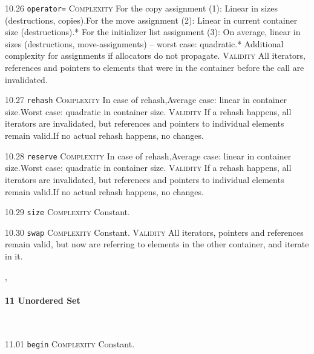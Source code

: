 \noindent\textcolor{corange}{10.26 \texttt{operator=}} \textsc{Complexity} For the copy assignment (1): Linear in sizes (destructions, copies).For the move assignment (2): Linear in current container size (destructions).* For the initializer list assignment (3): On average, linear in sizes (destructions, move-assignments) -- worst case: quadratic.* Additional complexity for assignments if allocators do not propagate. \textsc{Validity} All iterators, references and pointers to elements that were in the container before the call are invalidated.\vspace{0.5em}

\noindent\textcolor{corange}{10.27 \texttt{rehash}} \textsc{Complexity} In case of rehash,Average case: linear in container size.Worst case: quadratic in container size. \textsc{Validity} If a rehash happens, all iterators are invalidated, but references and pointers to individual elements remain valid.If no actual rehash happens, no changes.\vspace{0.5em}

\noindent\textcolor{corange}{10.28 \texttt{reserve}} \textsc{Complexity} In case of rehash,Average case: linear in container size.Worst case: quadratic in container size. \textsc{Validity} If a rehash happens, all iterators are invalidated, but references and pointers to individual elements remain valid.If no actual rehash happens, no changes.\vspace{0.5em}

\noindent\textcolor{cgreen}{10.29 \texttt{size}} \textsc{Complexity} Constant. \vspace{0.5em}

\noindent\textcolor{cgreen}{10.30 \texttt{swap}} \textsc{Complexity} Constant. \textsc{Validity} All iterators, pointers and references remain valid, but now are referring to elements in the other container, and iterate in it.\vspace{0.5em}


\sep
{}
\paragraph{11 Unordered Set}\mbox{}\\
\noindent\textcolor{cgreen}{11.01 \texttt{begin}} \textsc{Complexity} Constant. \vspace{0.5em}

